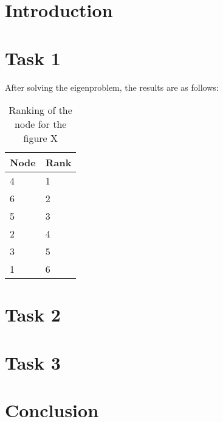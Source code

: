 \section{Introduction}

\section{Task 1}
After solving the eigenproblem, the results are as follows:
\begin{table}[htbp]
    \centering
    \begin{tabular}{ll}
        \toprule
        Node & Rank\\
        \midrule
        4 & 1\\
        6 & 2\\
        5 & 3\\
        2 & 4\\
        3 & 5\\
        1 & 6\\
        \bottomrule
    \end{tabular}
    \caption{Ranking of the node for the figure X}
\end{table}
\section{Task 2}

\section{Task 3}

\section{Conclusion}
